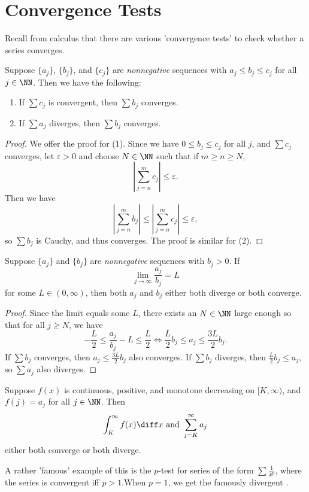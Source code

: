 \section{Convergence Tests}
Recall from calculus that there are various 'convergence tests' to check whether a series converges. 

\begin{theorem}
	Suppose $\{a_j\}$, $\{b_j\}$, and $\{c_j\}$ are \emph{nonnegative} sequences with $a_j \leq b_j \leq c_j$ for all $j \in \NN$. Then we have the following: 
	\begin{enumerate}
		\item If $\sum c_j$ is convergent, then $\sum b_j$ converges. 
		\item If $\sum a_j$ diverges, then $\sum b_j$ converges. 
	\end{enumerate}
\end{theorem}
\begin{proof}
	We offer the proof for (1). Since we have $0 \leq b_j \leq c_j$ for all $j$, and $\sum c_j$ converges, let $\varepsilon > 0$ and choose $N \in \NN$ such that if $m \geq n \geq N$, 
	\[ \left | \sum\limits_{j=n}^m c_j \right | \leq \varepsilon. \] Then we have 
	\[ \left | \sum_{j=n}^m b_j \right | \leq \left | \sum_{j=n}^m c_j \right | \leq \varepsilon, \] so $\sum b_j$ is Cauchy, and thus converges. The proof is similar for (2). 
\end{proof}

\begin{theorem}
	Suppose $\{a_j\}$ and $\{b_j\}$ are \emph{nonnegative} sequences with $b_j >0$. If 
	\[ \lim\limits_{j \to \infty} \dfrac{a_j}{b_j} = L \] for some $L \in (0, \infty)$, then both $a_j$ and $b_j$ either both diverge or both converge. 
\end{theorem}
\begin{proof}
	Since the limit equals some $L$, there exists an $N \in \NN$ large enough so that for all $j \geq N$, we have 
	\[ -\frac{L}{2} \leq \frac{a_j}{b_j} - L \leq \frac{L}{2} \Longleftrightarrow \frac{L}{2} b_j \leq a_j \leq \frac{3L}{2} b_j.\] If $\sum b_j$ converges, then $a_j \leq \frac{3L}{2} b_j$ also converges. If $\sum b_j$ diverges, then $\frac{L}{2} b_j \leq a_j$, so $\sum a_j$ also diverges. 
\end{proof}

\begin{theorem}
	Suppose $f(x)$ is continuous, positive, and monotone decreasing on $[K, \infty)$, and $f(j) = a_j$ for all $j \in \NN$. Then 
	\[ \int_K^\infty f(x) \diff x \text{ and } \sum_{j=K}^\infty a_j \] either both converge or both diverge. 
\end{theorem}
A rather 'famous' example of this is the $p$-test for series of the form $\sum \frac{1}{x^p}$, where the series is convergent iff $p > 1$.When $p=1$, we get the famously divergent . 

